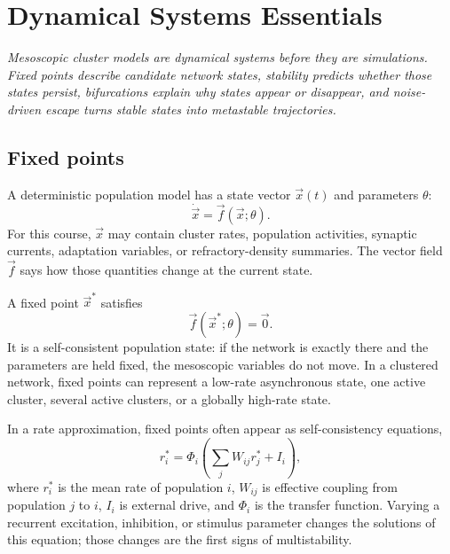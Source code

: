 \chapter{Dynamical Systems Essentials}
\label{ch:dynamical-systems-essentials}

\textit{Mesoscopic cluster models are dynamical systems before they are simulations. Fixed points describe candidate network states, stability predicts whether those states persist, bifurcations explain why states appear or disappear, and noise-driven escape turns stable states into metastable trajectories.}

\section{Fixed points}
\label{sec:fixed-points-clustered}

A deterministic population model has a state vector $\vec{x}(t)$ and parameters $\theta$:
%
\begin{equation}
  \dot{\vec{x}} = \vec{f}(\vec{x};\theta).
  \label{eq:deterministic-population-flow}
\end{equation}
%
For this course, $\vec{x}$ may contain cluster rates, population activities, synaptic currents, adaptation variables, or refractory-density summaries. The vector field $\vec{f}$ says how those quantities change at the current state.

A fixed point $\vec{x}^*$ satisfies
%
\begin{equation}
  \vec{f}(\vec{x}^*;\theta)=\vec{0}.
  \label{eq:fixed-point-definition}
\end{equation}
%
It is a self-consistent population state: if the network is exactly there and the parameters are held fixed, the mesoscopic variables do not move. In a clustered network, fixed points can represent a low-rate asynchronous state, one active cluster, several active clusters, or a globally high-rate state.

In a rate approximation, fixed points often appear as self-consistency equations,
%
\begin{equation}
  r_i^* = \Phi_i\!\left(\sum_j W_{ij}r_j^* + I_i\right),
  \label{eq:rate-self-consistency}
\end{equation}
%
where $r_i^*$ is the mean rate of population $i$, $W_{ij}$ is effective coupling from population $j$ to $i$, $I_i$ is external drive, and $\Phi_i$ is the transfer function. Varying a recurrent excitation, inhibition, or stimulus parameter changes the solutions of this equation; those changes are the first signs of multistability.

